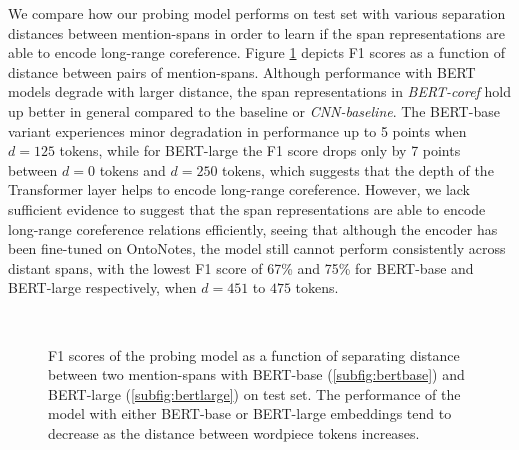 \documentclass[11pt]{article}
\begin{document}
We compare how our probing model performs on test set with various separation distances between mention-spans in order to learn if the span representations are able to encode long-range coreference. Figure \ref{fig:longrange_result} depicts F1 scores as a function of distance between pairs of mention-spans. Although performance with BERT models degrade with larger distance, the span representations in \textit{BERT-coref} hold up better in general compared to the baseline or \textit{CNN-baseline}. The BERT-base variant experiences minor degradation in performance up to 5 points when $d=125$ tokens, while for BERT-large the F1 score drops only by 7 points between $d=0$ tokens and $d=250$ tokens, which suggests that the depth of the Transformer layer helps to encode long-range coreference. However, we lack sufficient evidence to suggest that the span representations are able to encode long-range coreference relations efficiently, seeing that although the encoder has been fine-tuned on OntoNotes, the model still cannot perform consistently across distant spans, with the lowest F1 score of 67\% and 75\% for BERT-base and BERT-large respectively, when $d=451$ to $475$ tokens.
\begin{figure}[h!]
 \\
  \caption{F1 scores of the probing model as a function of separating distance between two mention-spans with BERT-base (\ref{subfig:bertbase}) and BERT-large (\ref{subfig:bertlarge}) on test set. The performance of the model with either BERT-base or BERT-large embeddings tend to decrease as the distance between wordpiece tokens increases.}
  \label{fig:longrange_result} 
\end{figure}
\end{document}
